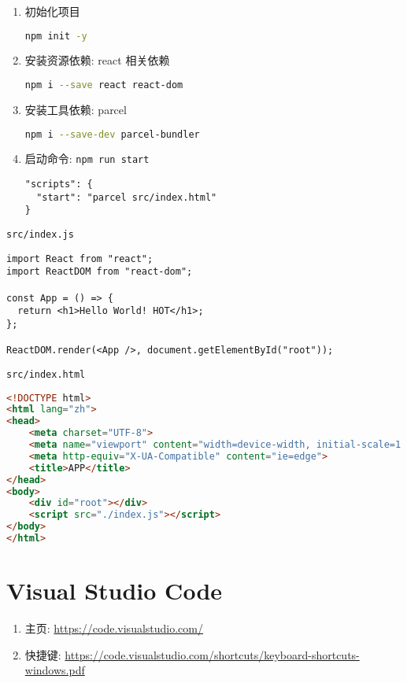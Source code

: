 \begin{enumerate}
\def\labelenumi{\arabic{enumi}.}
\item
  初始化项目

\begin{lstlisting}[language=bash]
npm init -y
\end{lstlisting}
\item
  安装资源依赖: react 相关依赖

\begin{lstlisting}[language=bash]
npm i --save react react-dom
\end{lstlisting}
\item
  安装工具依赖: parcel

\begin{lstlisting}[language=bash]
npm i --save-dev parcel-bundler
\end{lstlisting}
\item
  启动命令: \lstinline!npm run start!

\begin{lstlisting}
"scripts": {
  "start": "parcel src/index.html"
}
\end{lstlisting}
\end{enumerate}

\lstinline!src/index.js!

\begin{lstlisting}
import React from "react";
import ReactDOM from "react-dom";

const App = () => {
  return <h1>Hello World! HOT</h1>;
};

ReactDOM.render(<App />, document.getElementById("root"));
\end{lstlisting}

\lstinline!src/index.html!

\begin{lstlisting}[language=HTML]
<!DOCTYPE html>
<html lang="zh">
<head>
    <meta charset="UTF-8">
    <meta name="viewport" content="width=device-width, initial-scale=1.0">
    <meta http-equiv="X-UA-Compatible" content="ie=edge">
    <title>APP</title>
</head>
<body>
    <div id="root"></div>
    <script src="./index.js"></script>
</body>
</html>
\end{lstlisting}

\section{Visual Studio Code}\label{visual-studio-code}

\begin{enumerate}
\def\labelenumi{\arabic{enumi}.}
\tightlist
\item
  主页: \url{https://code.visualstudio.com/}
\item
  快捷键:
  \url{https://code.visualstudio.com/shortcuts/keyboard-shortcuts-windows.pdf}
\end{enumerate}

